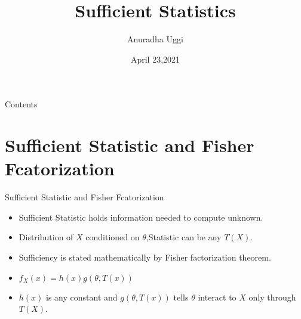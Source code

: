 \documentclass[aspectratio=169,xcolor=dvipsnames]{beamer}
\title[short title]{Sufficient Statistics} %
\subtitle{}
\author[Pin-Yen] {Anuradha Uggi}
\institute[NTU] %
{
    Department of Electrical Engineering \\
    Indian Institute of Technology Hyderabad %
}
\date{April 23,2021} %
\begin{document}
\begin{frame}
  \titlepage
\end{frame}

\begin{frame}{Contents}
  \tableofcontents
\end{frame}

\section{Sufficient Statistic and Fisher Fcatorization}

\begin{frame}{Sufficient Statistic and Fisher Fcatorization}
  \begin{itemize}
    \item Sufficient Statistic holds information needed to compute unknown. 
    \item Distribution of $X$ conditioned on $\theta$,Statistic can be any $T(X)$.
    \item Sufficiency is stated mathematically by Fisher factorization theorem.
    \item $f_X(x)=h(x)g(\theta,T(x))$
    \item $h(x)$ is any constant and $g(\theta,T(x))$ tells $\theta$ interact to $X$ only through $T(X)$.
  \end{itemize}
\end{frame}

\end{document}
